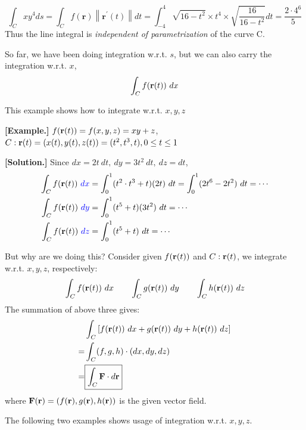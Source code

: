 \documentclass[11pt, a4paper]{MATH2023}
\newcommand{\eg}{\textbf{[Example.] }}
\newcommand{\sol}{\textbf{[Solution.] }}
\newcommand{\rr}{{\bf r}}
\newcommand{\FF}{{\bf F}}
\begin{document}
\begin{spacing}{1.3}
    $$ \int_{C} x y^{4} d s =\int_{C} f(\mathbf{r})\left\|\mathbf{r}^{\prime}(t)\right\| d t
    =\int_{-4}^{4} \sqrt{16-t^{2}} \times t^{4} \times \sqrt{\frac{16}{16-t^{2}}} d t=\frac{2\cdot 4^6}{5}$$
    Thus the line integral is {\it \blue independent of parametrization} of the curve C.

    So far, we have been doing integration w.r.t. $s$, but we can also carry the integration w.r.t. $x$,
    $$\int_C f(\rr(t))\ dx$$

    \vspace{0.3in}
    {\blue This example shows how to integrate w.r.t. $x,y,z$}

    \eg $f(\rr(t))=f(x,y,z)=xy+z$, $C: \rr(t)=(x(t), y(t), z(t)) = (t^2, t^3, t), 0\le t\le 1$

    \sol Since $dx=2t\ dt,\ dy=3t^2\ dt,\ dz=dt$,
    \begin{align*}
        \int_C f(\rr(t))\ {\blue dx} &= \int_0^1 (t^2\cdot t^3+t)(2t)\ dt=\int_0^1 (2t^6-2t^2)\ dt=\cdots\\
        \int_C f(\rr(t))\ {\blue dy} &= \int_0^1 (t^5+t)(3t^2)\ dt=\cdots\\
        \int_C f(\rr(t))\ {\blue dz} &= \int_0^1 (t^5+t)\ dt=\cdots
    \end{align*}

    \vspace{0.8in}
    But why are we doing this? Consider given $f(\rr(t))$ and $C: \rr(t)$, we integrate w.r.t. $x,y,z$, respectively: 
    $$\int_C f(\rr(t))\ dx\qquad \int_C g(\rr(t))\ dy\qquad \int_C h(\rr(t))\ dz$$
    The summation of above three gives: 
    \begin{align*}
        & \int_C \left[f(\rr(t))\ dx + g(\rr(t))\ dy + h(\rr(t))\ dz\right]\\
        =& \int_C (f, g, h) \cdot (dx, dy, dz)\\
        =& \boxed{\int_C \FF \cdot d\rr}
    \end{align*}
    where $\FF(\rr)=\left(f(\rr), g(\rr), h(\rr)\right)$ is the given vector field.


    \newpage
    {\blue The following two examples shows usage of integration w.r.t. $x, y, z$.}


\end{spacing}
\end{document}
